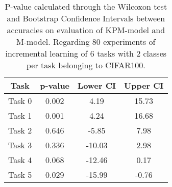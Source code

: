 \begin{table}[H]
\centering
\begin{tabular}{cccc}
\toprule
Task & p-value & Lower CI & Upper CI \\
\midrule
Task 0 & 0.002 &4.19 & 15.73 \\
Task 1 & 0.001 &4.24 & 16.68 \\
Task 2 & 0.646 &-5.85 & 7.98 \\
Task 3 & 0.336 &-10.03 & 2.98 \\
Task 4 & 0.068 &-12.46 & 0.17 \\
Task 5 & 0.029 &-15.99 & -0.76 \\
\bottomrule
\end{tabular}
\caption{P-value calculated through the Wilcoxon test and Bootstrap Confidence Intervals between accuracies on evaluation of KPM-model and M-model. Regarding 80 experiments of incremental learning of 6 tasks with 2 classes per task belonging to CIFAR100.}
\end{table}

